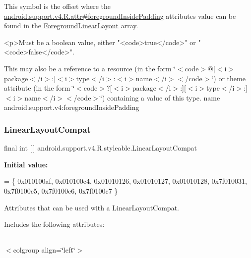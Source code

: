 This symbol is the offset where the \hyperlink{classandroid_1_1support_1_1v4_1_1R_1_1attr_a663fcdc23331956da2a2e08118e3d258}{android.\+support.\+v4.\+R.\+attr\#foreground\+Inside\+Padding} attribute\textquotesingle{}s value can be found in the \hyperlink{classandroid_1_1support_1_1v4_1_1R_1_1styleable_aa17438061ec7746b98c639b096be8466}{Foreground\+Linear\+Layout} array.

\begin{DoxyVerb}      <p>Must be a boolean value, either "<code>true</code>" or "<code>false</code>".
\end{DoxyVerb}
 

This may also be a reference to a resource (in the form \char`\"{}$<$code$>$@\mbox{[}$<$i$>$package$<$/i$>$\+:\mbox{]}$<$i$>$type$<$/i$>$\+:$<$i$>$name$<$/i$>$$<$/code$>$\char`\"{}) or theme attribute (in the form \char`\"{}$<$code$>$?\mbox{[}$<$i$>$package$<$/i$>$\+:\mbox{]}\mbox{[}$<$i$>$type$<$/i$>$\+:\mbox{]}$<$i$>$name$<$/i$>$$<$/code$>$\char`\"{}) containing a value of this type.  name android.\+support.\+v4\+:foreground\+Inside\+Padding \mbox{\label{classandroid_1_1support_1_1v4_1_1R_1_1styleable_a5410acb05d349e2b35bd2dbadc93b229}} 
\subsubsection{\texorpdfstring{Linear\+Layout\+Compat}{LinearLayoutCompat}}
{\footnotesize\ttfamily final int \mbox{[}$\,$\mbox{]} android.\+support.\+v4.\+R.\+styleable.\+Linear\+Layout\+Compat\hspace{0.3cm}{\ttfamily [static]}}

{\bfseries Initial value\+:}
\begin{DoxyCode}
= \{
            0x010100af, 0x010100c4, 0x01010126, 0x01010127,
            0x01010128, 0x7f010031, 0x7f0100c5, 0x7f0100c6,
            0x7f0100c7
        \}
\end{DoxyCode}
Attributes that can be used with a Linear\+Layout\+Compat. 

Includes the following attributes\+:

\tabulinesep=1mm
\begin{longtabu} spread 0pt [c]{*{0}{|X[-1]}|}
\hline
\end{longtabu}
$<$colgroup align=\char`\"{}left\char`\"{}$>$ 

